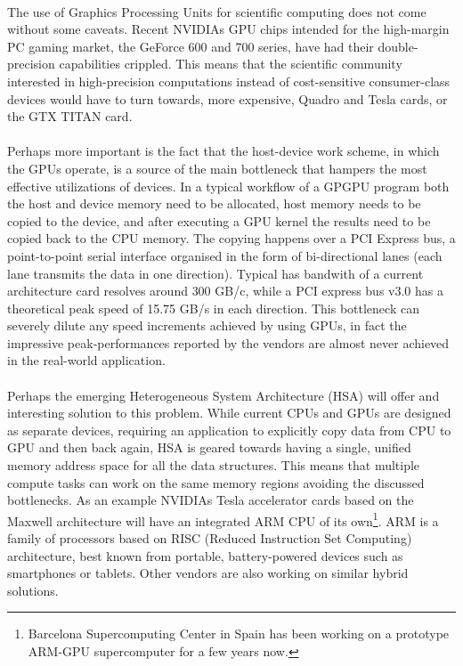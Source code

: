 \paragraph{}
The use of Graphics Processing Units for scientific computing does not come without some caveats.
Recent NVIDIAs GPU chips intended for the high-margin PC gaming market, the GeForce 600 and 700 series, have had their double-precision capabilities crippled.
This means that the scientific community interested in high-precision computations instead of cost-sensitive consumer-class devices would have to turn towards, more expensive, Quadro and Tesla cards, or the GTX TITAN card.

\paragraph{}
Perhaps more important is the fact that the host-device work scheme, in which the GPUs operate, is a source of the main bottleneck that hampers the most effective utilizations of devices.
In a typical workflow of a GPGPU program both the host and device memory need to be allocated, host memory needs to be copied to the device, and after executing a GPU kernel the results need to be copied back to the CPU memory.
The copying happens over a PCI Express bus, a point-to-point serial interface organised in the form of bi-directional lanes (each lane transmits the data in one direction).
Typical has bandwith of a current architecture card resolves around $300$ GB/c, while a PCI express bus v3.0 has a theoretical peak speed of 15.75 GB/s in each direction.
This bottleneck can severely dilute any speed increments achieved by using GPUs, in fact the impressive peak-performances reported by the vendors are almost never achieved in the real-world application.

\paragraph{}
Perhaps the emerging Heterogeneous System Architecture (HSA) will offer and interesting solution to this problem.
While current CPUs and GPUs are designed as separate devices, requiring an application to explicitly copy data from CPU to GPU and then back again, HSA is geared towards having a single, unified memory address space for all the data structures.
This means that multiple compute tasks can work on the same memory regions avoiding the discussed bottlenecks.
As an example NVIDIAs Tesla accelerator cards based on the Maxwell architecture will have an integrated ARM CPU of its own\footnote{Barcelona Supercomputing Center in Spain has been working on a prototype ARM-GPU supercomputer for a few years now.}.
ARM is a family of processors based on RISC (Reduced Instruction Set Computing) architecture, best known from portable, battery-powered devices such as smartphones or tablets. 
Other vendors are also working on similar hybrid solutions.

